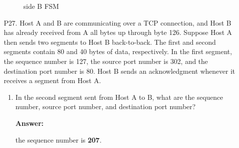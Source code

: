 \begin{enumerate}
	\begin{figure}[H]
        \centering
        \caption{side B FSM}
        \label{fig:2_B}
    \end{figure}

	
	\item[P27.] Host A and B are communicating over a TCP connection, and Host B has already received from A all bytes up through byte 126. Suppose Host A then sends two segments to Host B back-to-back. The first and second segments	contain 80 and 40 bytes of data, respectively. In the first segment, the sequence number is 127, the source port number is 302, and the destination	port number is 80. Host B sends an acknowledgment whenever it receives a segment from Host A.
	
	\begin{enumerate}
    	\item In the second segment sent from Host A to B, what are the sequence number, source port number, and destination port number?
    	
    	\textbf{Answer:}
    	
    	the sequence number is \textbf{207}. 
    	

\end{enumerate}
\end{enumerate}
